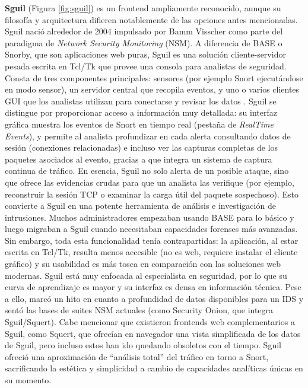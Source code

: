 \documentclass[11pt,a4paper,twoside]{report}
\begin{document}
\textbf{Sguil} (Figura \ref{fig:sguil}) es un frontend ampliamente reconocido, aunque su filosofía y arquitectura difieren notablemente de las opciones antes mencionadas. Sguil nació alrededor de 2004 impulsado por Bamm Visscher como parte del paradigma de \textit{Network Security Monitoring} (NSM). A diferencia de BASE o Snorby, que son aplicaciones web puras, Sguil es una solución cliente-servidor pesada escrita en Tcl/Tk que provee una consola para analistas de seguridad. Consta de tres componentes principales: sensores (por ejemplo Snort ejecutándose en modo sensor), un servidor central que recopila eventos, y uno o varios clientes GUI que los analistas utilizan para conectarse y revisar los datos \cite{sectoolsSguil}. Sguil se distingue por proporcionar acceso a información muy detallada: su interfaz gráfica muestra los eventos de Snort en tiempo real (pestaña de \textit{RealTime Events}), y permite al analista profundizar en cada alerta consultando datos de sesión (conexiones relacionadas) e incluso ver las capturas completas de los paquetes asociados al evento, gracias a que integra un sistema de captura continua de tráfico. En esencia, Sguil no solo alerta de un posible ataque, sino que ofrece las evidencias crudas para que un analista las verifique (por ejemplo, reconstruir la sesión TCP o examinar la carga útil del paquete sospechoso). Esto convierte a Sguil en una potente herramienta de análisis e investigación de intrusiones. Muchos administradores empezaban usando BASE para lo básico y luego migraban a Sguil cuando necesitaban capacidades forenses más avanzadas. Sin embargo, toda esta funcionalidad tenía contrapartidas: la aplicación, al estar escrita en Tcl/Tk, resulta menos accesible (no es web, requiere instalar el cliente gráfico) y su usabilidad es más tosca en comparación con las soluciones web modernas. Sguil está muy enfocada al especialista en seguridad, por lo que su curva de aprendizaje es mayor y su interfaz es densa en información técnica. Pese a ello, marcó un hito en cuanto a profundidad de datos disponibles para un IDS y sentó las bases de suites NSM actuales (como Security Onion, que integra Sguil/Squert). Cabe mencionar que existieron frontends web complementarios a Sguil, como Squert, que ofrecían en navegador una vista simplificada de los datos de Sguil, pero incluso estos han ido quedando obsoletos con el tiempo. Sguil ofreció una aproximación de “análisis total” del tráfico en torno a Snort, sacrificando la estética y simplicidad a cambio de capacidades analíticas únicas en su momento.\newline
\end{document}
